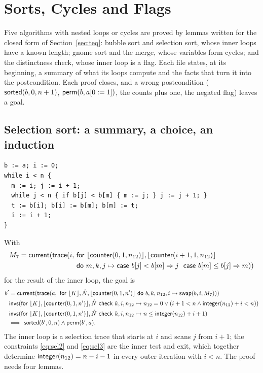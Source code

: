 \section{Sorts, Cycles and Flags}\label{sec:sorts}

Five algorithms with nested loops or cycles are proved by lemmas written for the closed form of
Section~\ref{sec:teq}: bubble sort and selection sort, whose inner loops have a known length; gnome sort and the
merge, whose variables form cycles; and the distinctness check, whose inner loop is a flag. Each file states, at its
beginning, a summary of what its loops compute and the facts that turn it into the postcondition. Each proof closes, and a wrong postcondition ($\mathsf{sorted}(b, 0, n + 1)$, $\mathsf{perm}(b, a[0 := 1])$, the counts plus one, the
negated flag) leaves a goal.

\subsection{Selection sort: a summary, a choice, an induction}\label{sec:sorts:selection}
\begin{lstlisting}
b := a; i := 0;
while i < n {
  m := i; j := i + 1;
  while j < n { if b[j] < b[m] { m := j; } j := j + 1; }
  t := b[i]; b[i] := b[m]; b[m] := t;
  i := i + 1;
}
\end{lstlisting}
With
\begin{align*}
  M_7 = \mathsf{current}(\mathsf{trace}(i,\ &\mathsf{for}\ \lfloor \mathsf{counter}(0, 1, n_{12})\rfloor, \lfloor \mathsf{counter}(i + 1, 1, n_{12})\rfloor\\
  &\mathsf{do}\ m, k, j \mapsto \mathsf{case}\ b[j] < b[m] \Rightarrow j\ \ \mathsf{case}\ b[m] \le b[j] \Rightarrow m))
\end{align*}
for the result of the inner loop, the goal is
\begin{align}
  b' &= \cur(\tr{a}{\bl{K}, \seq{N}, \bl{\cnt(0, 1, n')}}{b, k, n_{12}, i \mapsto \swap{b}{i}{M_7}}) \label{eq:sel1}\\
  &\mathsf{invs}(\mathsf{for}\ \bl{K}, \bl{\cnt(0, 1, n')}, \seq{N}\ \mathsf{check}\ k, i, n_{12} \mapsto
     n_{12} = 0 \vee (i + 1 < n \wedge \intf(n_{12}) + i < n)) \label{eq:sel2}\\
  &\al{\bl{K}, \bl{\cnt(0, 1, n')}, \seq{N}}{k, i, n_{12} \mapsto n \le \intf(n_{12}) + i + 1} \label{eq:sel3}\\
  &\Longrightarrow\ \sorted(b', 0, n) \wedge \perm(b', a). \nonumber
\end{align}
The inner loop is a selection trace that starts at $i$ and scans $j$ from $i + 1$; the constraints \eqref{eq:sel2} and
\eqref{eq:sel3} are the inner test and exit, which together determine $\mathsf{integer}(n_{12}) = n - i - 1$ in every outer
iteration with $i < n$.
The proof needs four lemmas.

